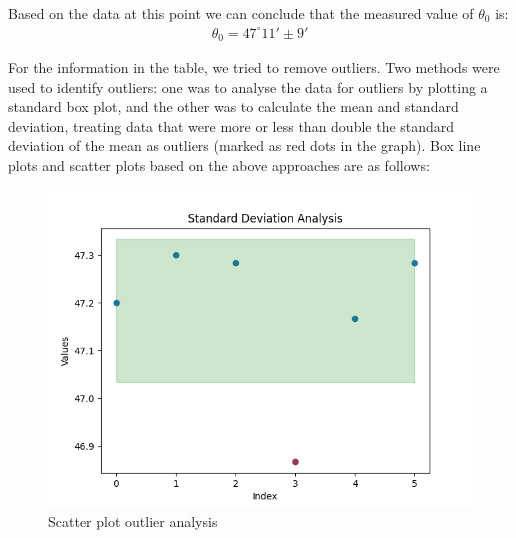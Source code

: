 \documentclass[UTF8]{article}
\begin{document}
    Based on the data at this point we can conclude that the measured value of $\theta _0$ is:
    \begin{eqnarray}
    \theta _0 = 47^{\circ} 11'\pm 9'
    \end{eqnarray}
    
    For the information in the table, we tried to remove outliers. Two methods were used to identify outliers: one was to analyse the data for outliers by plotting a standard box plot, and the other was to calculate the mean and standard deviation, treating data that were more or less than double the standard deviation of the mean as outliers (marked as red dots in the graph). Box line plots and scatter plots based on the above approaches are as follows:
     \begin{figure}[H]
                              			\begin{minipage}[t]{0.5\linewidth}
                              				\centering
                              				\includegraphics[clip,scale=0.5,trim={0 0 0 0}]{fig/fig18.png}
                              				\caption{ Scatter plot outlier analysis}
                              				\label{figure.18}
                              			\end{minipage}
                              			\begin{minipage}[t]{0.5\linewidth}
                              				\centering

\end{minipage}
\end{figure}
\end{document}
